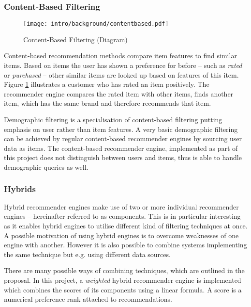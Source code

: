 \subsubsection{Content-Based Filtering}
\label{intro-bg-tech-contentbased}

\begin{figure}[ht]
    \texttt{[image: intro/background/contentbased.pdf]}
    \caption{Content-Based Filtering (Diagram)}
    \label{fig:intro-techniques-contentbased}
\end{figure}

Content-based recommendation methods compare item features to find similar items. Based on items the user has shown a preference for before -- such as \emph{rated} or \emph{purchased} -- other similar items are looked up based on features of this item. Figure \ref{fig:intro-techniques-contentbased} illustrates a customer who has rated an item positively. The recommender engine compares the rated item with other items, finds another item, which has the same brand and therefore recommends that item.

Demographic filtering is a specialisation of content-based filtering putting emphasis on user rather than item features. A very basic demographic filtering can be achieved by regular content-based recommender engines by sourcing user data as items. The content-based recommender engine, implemented as part of this project does not distinguish between users and items, thus is able to handle demographic queries as well.

\subsubsection{Hybrids}
\label{intro-bg-tech-hybrid}

Hybrid recommender engines make use of two or more individual recommender engines -- hereinafter referred to as components. This is in particular interesting as it enables hybrid engines to utilise different kind of filtering techniques at once. A possible motivation of using hybrid engines is to overcome weaknesses of one engine with another. However it is also possible to combine systems implementing the same technique but e.g. using different data sources.

There are many possible ways of combining techniques, which are outlined in the proposal. In this project, a \emph{weighted} hybrid recommender engine is implemented which combines the scores of its components using a linear formula. A score is a numerical preference rank attached to recommendations.

